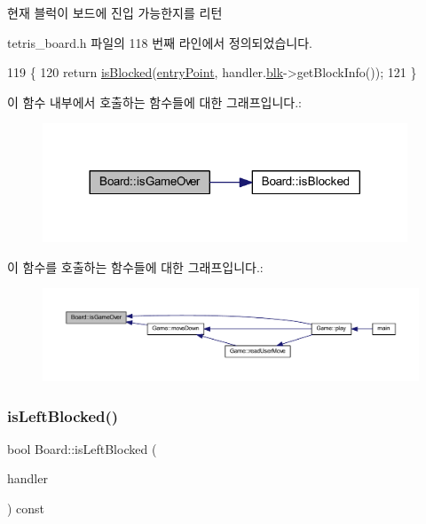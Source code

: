 현재 블럭이 보드에 진입 가능한지를 리턴 



tetris\+\_\+board.\+h 파일의 118 번째 라인에서 정의되었습니다.


\begin{DoxyCode}
119     \{
120         \textcolor{keywordflow}{return} \mbox{\hyperlink{class_board_a61ff9b1284e5c3e1214a780361ed650b}{isBlocked}}(\mbox{\hyperlink{class_board_a51d0b870dfe79367034bdda967e63a82}{entryPoint}}, handler.\mbox{\hyperlink{class_block_handler_ab57212ded2552ab5559d278c8538c454}{blk}}->getBlockInfo());
121     \}
\end{DoxyCode}
이 함수 내부에서 호출하는 함수들에 대한 그래프입니다.\+:
\nopagebreak
\begin{figure}[H]
\begin{center}
\leavevmode
\includegraphics[width=308pt]{class_board_a538ca2c02fbccf3af07ed3c821d9a736_cgraph}
\end{center}
\end{figure}
이 함수를 호출하는 함수들에 대한 그래프입니다.\+:
\nopagebreak
\begin{figure}[H]
\begin{center}
\leavevmode
\includegraphics[width=350pt]{class_board_a538ca2c02fbccf3af07ed3c821d9a736_icgraph}
\end{center}
\end{figure}
\mbox{\label{class_board_a5545704e21b5f7447eb9ffe014954cb3}} 
\subsubsection{\texorpdfstring{is\+Left\+Blocked()}{isLeftBlocked()}}
{\footnotesize\ttfamily bool Board\+::is\+Left\+Blocked (\begin{DoxyParamCaption}\item[{const \mbox{\hyperlink{class_block_handler}{Block\+Handler}} \&}]{handler }\end{DoxyParamCaption}) const\hspace{0.3cm}{\ttfamily [inline]}}



